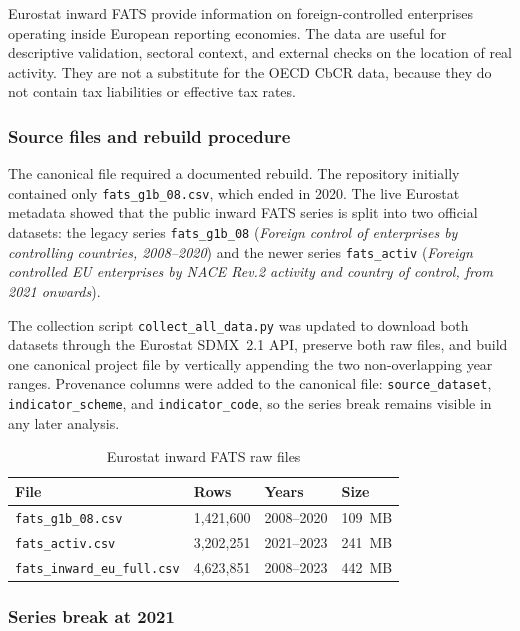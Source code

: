 \documentclass[11pt,a4paper]{article}
\begin{document}
Eurostat inward FATS provide information on foreign-controlled enterprises operating inside European reporting economies.  The data are useful for descriptive validation, sectoral context, and external checks on the location of real activity.  They are not a substitute for the OECD CbCR data, because they do not contain tax liabilities or effective tax rates.

\subsubsection{Source files and rebuild procedure}

The canonical file required a documented rebuild.  The repository initially
contained only \texttt{fats\_g1b\_08.csv}, which ended in 2020.  The live
Eurostat metadata showed that the public inward FATS series is split into two
official datasets: the legacy series \texttt{fats\_g1b\_08}
(\emph{Foreign control of enterprises by controlling countries, 2008--2020})
and the newer series \texttt{fats\_activ}
(\emph{Foreign controlled EU enterprises by NACE Rev.2 activity and country of
control, from 2021 onwards}).

The collection script \texttt{collect\_all\_data.py} was updated to download
both datasets through the Eurostat SDMX~2.1 API, preserve both raw files, and
build one canonical project file by vertically appending the two
non-overlapping year ranges.  Provenance columns were added to the canonical
file: \texttt{source\_dataset}, \texttt{indicator\_scheme}, and
\texttt{indicator\_code}, so the series break remains visible in any later
analysis.

\begin{table}[H]
\centering
\caption{Eurostat inward FATS raw files}\label{tab:fats_files}
\begin{tabular}{@{}L{5.5cm} C{1.8cm} C{2.0cm} C{2.0cm}@{}}
\toprule
\textbf{File} & \textbf{Rows} & \textbf{Years} & \textbf{Size} \\
\midrule
\texttt{fats\_g1b\_08.csv}          & 1{,}421{,}600 & 2008--2020 & 109~MB \\
\texttt{fats\_activ.csv}            & 3{,}202{,}251 & 2021--2023 & 241~MB \\
\texttt{fats\_inward\_eu\_full.csv} & 4{,}623{,}851 & 2008--2023 & 442~MB \\
\bottomrule
\end{tabular}
\end{table}

\subsubsection{Series break at 2021}
\end{document}
